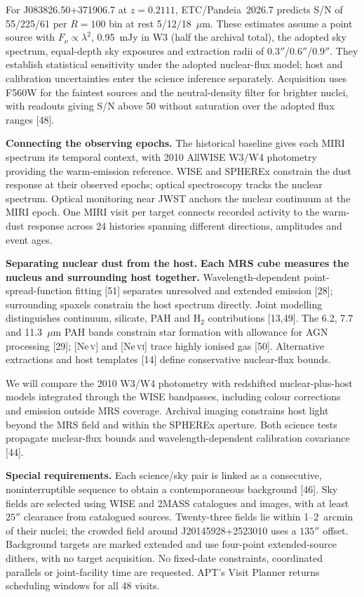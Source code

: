 \documentclass[12pt]{article}
\begin{document}
For J083826.50+371906.7 at $z=0.2111$, ETC/Pandeia~2026.7 predicts S/N of 55/225/61 per $R=100$ bin at rest 5/12/18~$\mu$m. These estimates assume a point source with $F_\nu\propto\lambda^2$, 0.95~mJy in W3 (half the archival total), the adopted sky spectrum, equal-depth sky exposures and extraction radii of $0.3''$/$0.6''$/$0.9''$. They establish statistical sensitivity under the adopted nuclear-flux model; host and calibration uncertainties enter the science inference separately. Acquisition uses F560W for the faintest sources and the neutral-density filter for brighter nuclei, with readouts giving S/N above 50 without saturation over the adopted flux ranges [48].

\noindent\textbf{Connecting the observing epochs.}
The historical baseline gives each MIRI spectrum its temporal context, with 2010 AllWISE W3/W4 photometry providing the warm-emission reference. WISE and SPHEREx constrain the dust response at their observed epochs; optical spectroscopy tracks the nuclear spectrum. Optical monitoring near JWST anchors the nuclear continuum at the MIRI epoch. One MIRI visit per target connects recorded activity to the warm-dust response across 24 histories spanning different directions, amplitudes and event ages.

\noindent\textbf{Separating nuclear dust from the host.}
\textbf{Each MRS cube measures the nucleus and surrounding host together.} Wavelength-dependent point-spread-function fitting [51] separates unresolved and extended emission [28]; surrounding spaxels constrain the host spectrum directly. Joint modelling distinguishes continuum, silicate, PAH and H$_2$ contributions [13,49]. The 6.2, 7.7 and 11.3~$\mu$m PAH bands constrain star formation with allowance for AGN processing [29]; [Ne\,\textsc{v}] and [Ne\,\textsc{vi}] trace highly ionised gas [50]. Alternative extractions and host templates [14] define conservative nuclear-flux bounds.

We will compare the 2010 W3/W4 photometry with redshifted nuclear-plus-host models integrated through the WISE bandpasses, including colour corrections and emission outside MRS coverage. Archival imaging constrains host light beyond the MRS field and within the SPHEREx aperture. Both science tests propagate nuclear-flux bounds and wavelength-dependent calibration covariance [44].

\clearpage
\supplementalinformation
\noindent\textbf{Special requirements.} Each science/sky pair is linked as a consecutive, noninterruptible sequence to obtain a contemporaneous background [46]. Sky fields are selected using WISE and 2MASS catalogues and images, with at least $25''$ clearance from catalogued sources. Twenty-three fields lie within 1--2~arcmin of their nuclei; the crowded field around J20145928+2523010 uses a $135''$ offset. Background targets are marked extended and use four-point extended-source dithers, with no target acquisition. No fixed-date constraints, coordinated parallels or joint-facility time are requested. APT's Visit Planner returns scheduling windows for all 48 visits.
\end{document}
